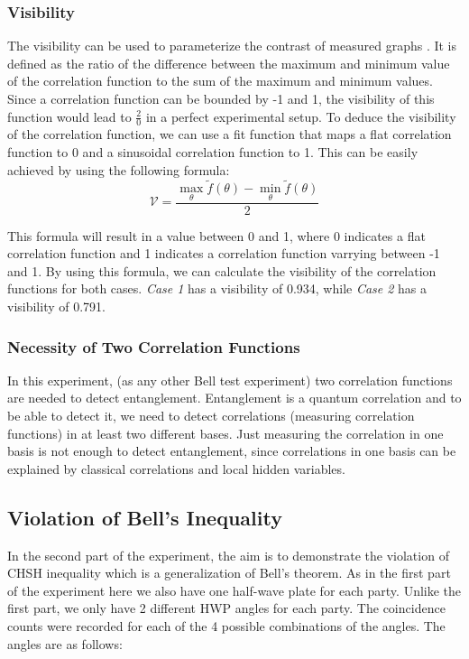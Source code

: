 \subsubsection{Visibility}
The visibility can be used to parameterize the contrast of measured graphs \cite{manual}. It is defined as the ratio of the difference between the maximum and minimum value of the correlation function to the sum of the maximum and minimum values.
Since a correlation function can be bounded by -1 and 1, the visibility of this function would lead to $\frac{2}{0}$ in a perfect experimental setup. 
To deduce the visibility of the correlation function, we can use a fit function that maps a flat correlation function to 0 and a sinusoidal correlation function to 1.
This can be easily achieved by using the following formula:
\[\mathcal{V} = \frac{\max_{\theta} \tilde{f}(\theta) - \min_{\theta} \tilde{f}(\theta)}{2}\]

This formula will result in a value between 0 and 1, where 0 indicates a flat correlation function and 1 indicates a correlation function varrying between -1 and 1. By using this formula, we can calculate the visibility of the correlation functions for both cases.
{\itshape Case 1} has a visibility of 0.934, while {\itshape Case 2} has a visibility of 0.791.

\subsubsection{Necessity of Two Correlation Functions}
In this experiment, (as any other Bell test experiment) two correlation functions are needed to detect entanglement. Entanglement is a quantum correlation and to be able to detect it, 
we need to detect correlations (measuring correlation functions) in at least two different bases. Just measuring the correlation in one basis is not enough to detect entanglement, since 
correlations in one basis can be explained by classical correlations and local hidden variables\cite{bell,chsh}.  


\subsection{Violation of Bell’s Inequality}
In the second part of the experiment, the aim is to demonstrate the violation of CHSH inequality which is a 
generalization of Bell's theorem\cite{chsh}. As in the first part of the experiment
here we also have one half-wave plate for each party. Unlike the first part, we only have 2 different HWP angles
for each party. The coincidence counts were recorded for each of the 4 possible combinations of the angles.
The angles are as follows:


